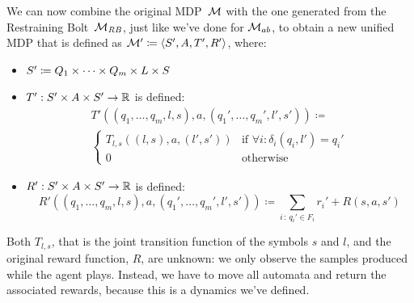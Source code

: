 We can now combine the original MDP~$\mathcal{M}$ with the one generated from the
Restraining Bolt~$\mathcal{M}_{\text{\textit{RB}}}$, just like we've done for $\mathcal{M}_{ab}$,
to obtain a new unified MDP that is defined as $\mathcal{M}' \coloneqq \langle S',
A, T', R' \rangle$, where:
\begin{itemize}
	\item $S' \coloneqq Q_1 \times \dots \times Q_m \times L \times S$
	\item $T' : S' \times A \times S' \to \mathbb{R}$ is defined:
		\begin{multline*}
			T'((q_1, \dots, q_m, l, s), a, (q_1', \dots, q_m', l', s')) \coloneqq \\
			\begin{cases}
				T_{l,s}((l,s), a, (l',s')) &
					\text{if $\forall i : \delta_i(q_i, l') = q_i'$} \\
				0 & \text{otherwise}
			\end{cases}
		\end{multline*}
	\item $R' : S' \times A \times S' \to \mathbb{R}$ is defined:
		\[
			R'((q_1, \dots, q_m, l, s), a, (q_1', \dots, q_m', l', s')) \coloneqq
			\sum_{i\, :\, q_i' \in F_i} r_i' + R(s, a, s')
		\]
\end{itemize}
Both $T_{l,s}$, that is the joint transition function of the symbols $s$ and
$l$, and the original reward function, $R$, are unknown: we only observe the
samples produced while the agent plays. Instead, we have to move all
automata and return the associated rewards, because this is a dynamics we've
defined.

